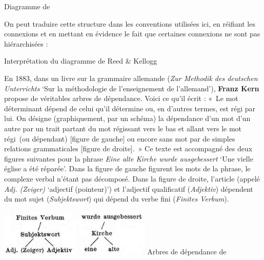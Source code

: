 {    Diagramme de \citet{ReedKellogg1877}
    \z

    On peut traduire cette structure dans les conventions utilisées ici, en réifiant les connexions et en mettant en évidence le fait que certaines connexions ne sont pas hiérarchisées :

    \ea

    Interprétation du diagramme de Reed \& Kellogg
    \z

    En 1883, dans un livre sur la grammaire allemande (\textit{Zur Methodik des deutschen Unterrichts} ‘Sur la méthodologie de l’enseignement de l’allemand’), \textbf{Franz Kern} propose de véritables arbres de dépendance. Voici ce qu’il écrit : «~Le mot déterminant dépend de celui qu’il détermine ou, en d’autres termes, est régi par lui. On désigne (graphiquement, par un schéma) la dépendance d’un mot d’un autre par un trait partant du mot régissant vers le bas et allant vers le mot régi~(ou dépendant) [figure de gauche] ou encore sans mot par de simples relations grammaticales [figure de droite].~» Ce texte est accompagné des deux figures suivantes pour la phrase \textit{Eine alte Kirche wurde ausgebessert} ‘Une vielle église a été réparée’. Dans la figure de gauche figurent les mots de la phrase, le complexe verbal n’étant pas décomposé. Dans la figure de droite, l’article (appelé \textit{Adj. (Zeiger)} ‘adjectif (pointeur)’) et l’adjectif qualificatif (\textit{Adjektiv}) dépendent du mot sujet (\textit{Subjektswort}) qui dépend du verbe fini (\textit{Finites Verbum}).

    \ea
    \includegraphics[width=.45\textwidth]{figures/vol1syntaxe2-img014.png}
    \includegraphics[width=.45\textwidth]{figures/vol1syntaxe2-img015.png}
    Arbres de dépendance de \citet{Kern1883}

}
